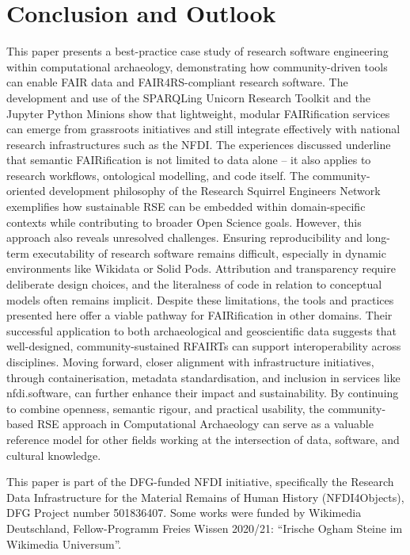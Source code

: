 \documentclass{eceasst}
\begin{document}
\section{Conclusion and Outlook}
\label{sec:conclusion}

This paper presents a best-practice case study of research software engineering within computational archaeology, demonstrating how community-driven tools can enable FAIR data and FAIR4RS-compliant research software. The development and use of the SPARQLing Unicorn Research Toolkit and the Jupyter Python Minions show that lightweight, modular FAIRification services can emerge from grassroots initiatives and still integrate effectively with national research infrastructures such as the NFDI. The experiences discussed underline that semantic FAIRification is not limited to data alone – it also applies to research workflows, ontological modelling, and code itself. The community-oriented development philosophy of the Research Squirrel Engineers Network exemplifies how sustainable RSE can be embedded within domain-specific contexts while contributing to broader Open Science goals. However, this approach also reveals unresolved challenges. Ensuring reproducibility and long-term executability of research software remains difficult, especially in dynamic environments like Wikidata or Solid Pods. Attribution and transparency require deliberate design choices, and the literalness of code in relation to conceptual models often remains implicit. Despite these limitations, the tools and practices presented here offer a viable pathway for FAIRification in other domains. Their successful application to both archaeological and geoscientific data suggests that well-designed, community-sustained RFAIRTs can support interoperability across disciplines. Moving forward, closer alignment with infrastructure initiatives, through containerisation, metadata standardisation, and inclusion in services like nfdi.software, can further enhance their impact and sustainability. By continuing to combine openness, semantic rigour, and practical usability, the community-based RSE approach in Computational Archaeology can serve as a valuable reference model for other fields working at the intersection of data, software, and cultural knowledge.

\begin{acknowledge}
This paper is part of the DFG-funded NFDI initiative, specifically the Research Data Infrastructure for the Material Remains of Human History (NFDI4Objects), DFG Project number 501836407. Some works were funded by Wikimedia Deutschland, Fellow-Programm Freies Wissen 2020/21: “Irische Ogham Steine im Wikimedia Universum”.
\end{acknowledge}

\nocite{*}


\end{document}
